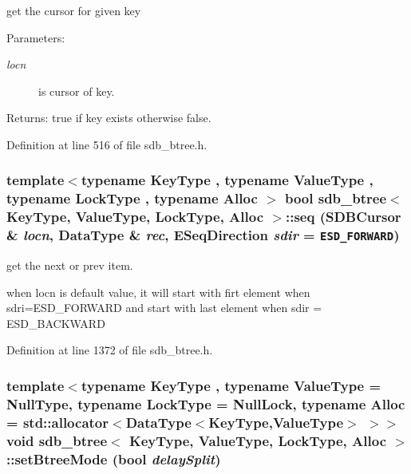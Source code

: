 get the cursor for given key 

\begin{Desc}
\item[Parameters:]
\begin{description}
\item[{\em locn}]is cursor of key. \end{description}
\end{Desc}
\begin{Desc}
\item[Returns:]true if key exists otherwise false. \end{Desc}


Definition at line 516 of file sdb\_\-btree.h.\hypertarget{classsdb__btree_dfcd196457bcb4517403a6471a7076af}{
\subsubsection[{seq}]{\setlength{\rightskip}{0pt plus 5cm}template$<$typename KeyType , typename ValueType , typename LockType , typename Alloc $>$ bool {\bf sdb\_\-btree}$<$ KeyType, ValueType, LockType, Alloc $>$::seq (SDBCursor \& {\em locn}, \/  DataType \& {\em rec}, \/  ESeqDirection {\em sdir} = {\tt ESD\_\-FORWARD})}}
\label{classsdb__btree_dfcd196457bcb4517403a6471a7076af}


get the next or prev item. 

when locn is default value, it will start with firt element when sdri=ESD\_\-FORWARD and start with last element when sdir = ESD\_\-BACKWARD 

Definition at line 1372 of file sdb\_\-btree.h.\hypertarget{classsdb__btree_1f6eb93d26b290d3969de6503672ae07}{
\subsubsection[{setBtreeMode}]{\setlength{\rightskip}{0pt plus 5cm}template$<$typename KeyType , typename ValueType  = NullType, typename LockType  = NullLock, typename Alloc  = std::allocator$<$DataType$<$KeyType,ValueType$>$ $>$$>$ void {\bf sdb\_\-btree}$<$ KeyType, ValueType, LockType, Alloc $>$::setBtreeMode (bool {\em delaySplit})}}
\label{classsdb__btree_1f6eb93d26b290d3969de6503672ae07}



